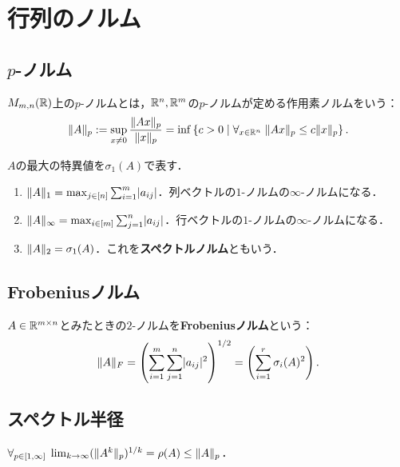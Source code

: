 \documentclass[uplatex, dvipdfmx]{jsreport}
\begin{document}
\section{行列のノルム}

\subsection{$p$-ノルム}

\begin{definition}[$p$-norm]
    $M_{m,n}(\mathbb{R})$上の$p$-ノルムとは，$\mathbb{R}^n,\mathbb{R}^m$の$p$-ノルムが定める作用素ノルムをいう：
    \[\|A\|_p:=\sup_{x\ne 0}\frac{\|Ax\|_p}{\|x\|_p}=\inf\left\{c>0\mid\forall_{x\in\mathbb{R}^n}\;\|Ax\|_p\le c\|x\|_p\right\}.\]
\end{definition}

\begin{lemma}
    $A$の最大の特異値を$\sigma_1(A)$で表す．
    \begin{enumerate}
        \item $\|A\|_1=\max_{j\in[n]}\sum_{i=1}^m\lvert a_{ij}\rvert$．列ベクトルの$1$-ノルムの$\infty$-ノルムになる．
        \item $\|A\|_\infty=\max_{i\in[m]}\sum^n_{j=1}\lvert a_{ij}\rvert$．行ベクトルの$1$-ノルムの$\infty$-ノルムになる．
        \item $\|A\|_2=\sigma_1(A)$．これを\textbf{スペクトルノルム}ともいう．
    \end{enumerate}
\end{lemma}

\subsection{Frobeniusノルム}

\begin{definition}
    $A\in\mathbb{R}^{m\times n}$とみたときの$2$-ノルムを\textbf{Frobeniusノルム}という：
    \[\|A\|_F=\left(\sum^m_{i=1}\sum^n_{j=1}\lvert a_{ij}\rvert^2\right)^{1/2}=\left(\sum_{i=1}^r\sigma_i(A)^2\right).\]
\end{definition}

\subsection{スペクトル半径}

\begin{proposition}[スペクトル半径公式]
    $\forall_{p\in[1,\infty]}\;\lim_{k\to\infty}(\|A^k\|_p)^{1/k}=\rho(A)\le\|A\|_p$．
\end{proposition}
\end{document}
